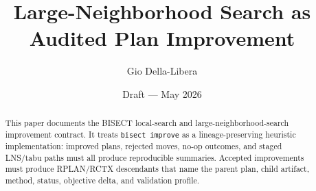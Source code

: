 \documentclass[12pt]{article}
\title{Large-Neighborhood Search as Audited Plan Improvement}
\author{Gio Della-Libera}
\date{Draft --- May 2026}
\begin{document}
\maketitle

\begin{abstract}
This paper documents the BISECT local-search and large-neighborhood-search
improvement contract. It treats \texttt{bisect improve} as a
lineage-preserving heuristic implementation: improved plans, rejected moves,
no-op outcomes, and staged LNS/tabu paths must all produce reproducible
summaries. Accepted improvements must produce RPLAN/RCTX descendants that name
the parent plan, child artifact, method, status, objective delta, and
validation profile.
\end{abstract}








\nocite{bisect-u18-plan}


\end{document}
